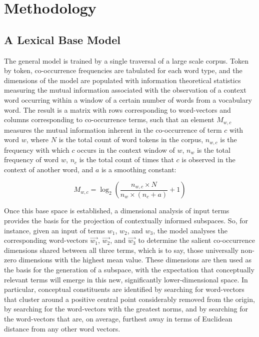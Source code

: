 \chapter{Methodology}

\section{A Lexical Base Model}
The general model is trained by a single traversal of a large scale corpus.  Token by token, co-occurrence frequencies are tabulated for each word type, and the dimensions of the model are populated with information theoretical statistics measuring the mutual information associated with the observation of a context word occurring within a window of a certain number of words from a vocabulary word.  The result is a matrix with rows corresponding to word-vectors and columns corresponding to co-occurrence terms, such that an element $M_{w,c}$ measures the mutual information inherent in the co-occurrence of term $c$ with word $w$, where $N$ is the total count of word tokens in the corpus, $n_{w,c}$ is the frequency with which $c$ occurs in the context window of $w$, $n_w$ is the total frequency of word $w$, $n_c$ is the total count of times that $c$ is observed in the context of another word, and $a$ is a smoothing constant:

\begin{equation}\label{eq:MI}
M_{w,c} = \log_2 \left(\frac{n_{w,c} \times N}{n_w \times \left(n_c + a\right)} + 1\right)
\end{equation}

Once this base space is established, a dimensional analysis of input terms provides the basis for the projection of contextually informed subspaces.  So, for instance, given an input of terms $w_1$, $w_2$, and $w_3$, the model analyses the corresponding word-vectors $\overrightarrow{w_1}$, $\overrightarrow{w_2}$, and $\overrightarrow{w_3}$ to determine the salient co-occurrence dimensions shared between all three terms, which is to say, those universally non-zero dimensions with the highest mean value.  These dimensions are then used as the basis for the generation of a subspace, with the expectation that conceptually relevant terms will emerge in this new, significantly lower-dimensional space.  In particular, conceptual constituents are identified by searching for word-vectors that cluster around a positive central point considerably removed from the origin, by searching for the word-vectors with the greatest norms, and by searching for the word-vectors that are, on average, furthest away in terms of Euclidean distance from any other word vectors.


